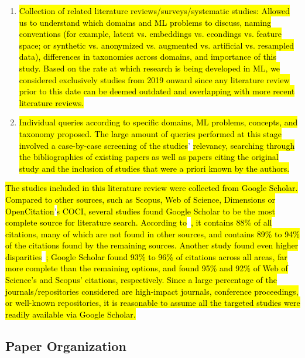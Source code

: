 \begin{enumerate}

    \item \hl{Collection of related literature reviews/surveys/systematic studies:
        Allowed us to understand which domains and ML problems to discuss,
        naming conventions (for example, latent vs. embeddings vs. econdings
        vs. feature space; or synthetic vs. anonymized vs. augmented vs.
        artificial vs. resampled data), differences in taxonomies across
        domains, and importance of this study.  Based on the rate at which
        research is being developed in ML, we considered exclusively studies
        from 2019 onward since any literature review prior to this date can be
        deemed outdated and overlapping with more recent literature reviews.}

    \item \hl{Individual queries according to specific domains, ML problems,
        concepts, and taxonomy proposed. The large amount of queries performed
        at this stage involved a case-by-case screening of the studies}’
        \hl{relevancy, searching through the bibliographies of existing papers as
        well as papers citing the original study and the inclusion of studies
        that were a priori known by the authors.} 

\end{enumerate}

\hl{The studies included in this literature review were collected from Google
Scholar. Compared to other sources, such as Scopus, Web of Science, Dimensions
or OpenCitation}’\hl{s COCI, several studies found Google Scholar to be the most
complete source for literature search. According
to}~\cite{martin2021google}\hl{,
it contains 88\% of all citations, many of which are not found in other
sources, and contains 89\% to 94\% of the citations found by the remaining
sources. Another study found even higher
disparities}~\cite{martin2018google}\hl{;
Google Scholar found 93\% to 96\% of citations across all areas, far more
complete than the remaining options, and found 95\% and 92\% of Web of
Science's and Scopus' citations, respectively. Since a large percentage of the
journals/repositories considered are high-impact journals, conference
proceedings, or well-known repositories, it is reasonable to assume all the
targeted studies were readily available via Google Scholar.}


\subsection{Paper Organization}

